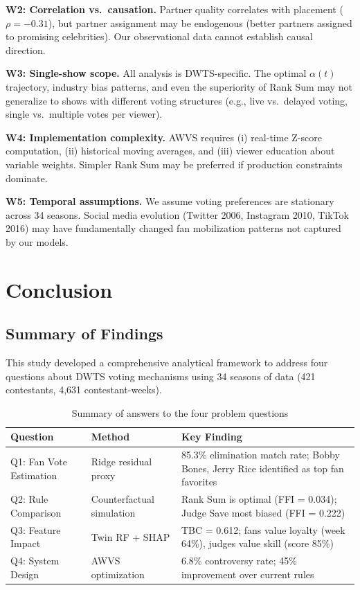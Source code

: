 \documentclass{mcmthesis}
\begin{document}
\textbf{W2: Correlation vs.\ causation.} Partner quality correlates with placement ($\rho = -0.31$), but partner assignment may be endogenous (better partners assigned to promising celebrities). Our observational data cannot establish causal direction.

\textbf{W3: Single-show scope.} All analysis is DWTS-specific. The optimal $\alpha(t)$ trajectory, industry bias patterns, and even the superiority of Rank Sum may not generalize to shows with different voting structures (e.g., live vs.\ delayed voting, single vs.\ multiple votes per viewer).

\textbf{W4: Implementation complexity.} AWVS requires (i) real-time Z-score computation, (ii) historical moving averages, and (iii) viewer education about variable weights. Simpler Rank Sum may be preferred if production constraints dominate.

\textbf{W5: Temporal assumptions.} We assume voting preferences are stationary across 34 seasons. Social media evolution (Twitter 2006, Instagram 2010, TikTok 2016) may have fundamentally changed fan mobilization patterns not captured by our models.

\section{Conclusion}

\subsection{Summary of Findings}

This study developed a comprehensive analytical framework to address four questions about DWTS voting mechanisms using 34 seasons of data (421 contestants, 4,631 contestant-weeks).

\begin{table}[h]
\centering
\caption{Summary of answers to the four problem questions}
\begin{tabular}{l p{5cm} p{5cm}}
\toprule
Question & Method & Key Finding \\
\midrule
Q1: Fan Vote Estimation & Ridge residual proxy & 85.3\% elimination match rate; Bobby Bones, Jerry Rice identified as top fan favorites \\
Q2: Rule Comparison & Counterfactual simulation & Rank Sum is optimal (FFI = 0.034); Judge Save most biased (FFI = 0.222) \\
Q3: Feature Impact & Twin RF + SHAP & TBC = 0.612; fans value loyalty (week 64\%), judges value skill (score 85\%) \\
Q4: System Design & AWVS optimization & 6.8\% controversy rate; 45\% improvement over current rules \\
\bottomrule
\end{tabular}
\end{table}
\end{document}
